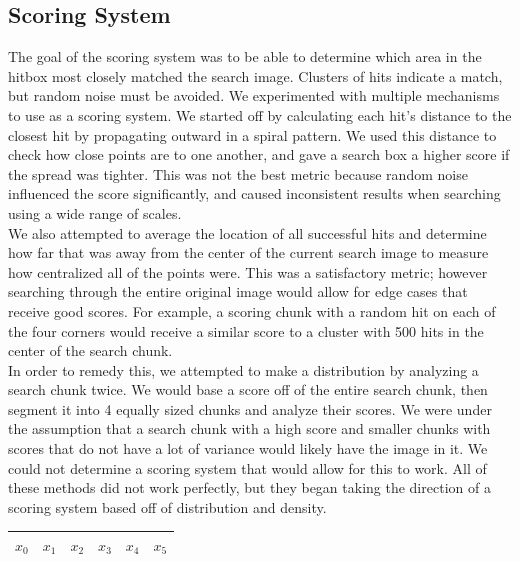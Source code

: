 \documentclass[10pt, journal]{vgtc}                %
\newcommand\tab[1][1cm]{\hspace*{#1}}
\begin{document}
\subsection{Scoring System}
\begin{flushleft}
\tab The goal of the scoring system was to be able to determine which area in the hitbox most closely matched the search image. Clusters of hits indicate a match, but random noise must be avoided. We experimented with multiple mechanisms to use as a scoring system. We started off by calculating each hit’s distance to the closest hit by propagating outward in a spiral pattern. We used this distance to check how close points are to one another, and gave a search box a higher score if the spread was tighter. This was not the best metric because random noise influenced the score significantly, and caused inconsistent results when searching using a wide range of scales.\\\smallskip
\tab We also attempted to average the location of all successful hits and determine how far that was away from the center of the current search image to measure how centralized all of the points were. This was a satisfactory metric; however searching through the entire original image would allow for edge cases that receive good scores. For example, a scoring chunk with a random hit on each of the four corners would receive a similar score to a cluster with 500 hits in the center of the search chunk. \\\smallskip
\tab In order to remedy this, we attempted to make a distribution by analyzing a search chunk twice. We would base a score off of the entire search chunk, then segment it into 4 equally sized chunks and analyze their scores. We were under the assumption that a search chunk with a high score and smaller chunks with scores that do not have a lot of variance would likely have the image in it. We could not determine a scoring system that would allow for this to work. All of these methods did not work perfectly, but they began taking the direction of a scoring system based off of distribution and density. \\\smallskip
\begin{table}[h!]
	\label{vis_accept}
	\scriptsize
	\begin{center}
		\begin{tabular}{cccccc}
			$x_0$ & $x_1$ & $x_2$ & $x_3$ & $x_4$  & $x_5$\\
			\hline

\end{tabular}
\end{center}
\end{table}
\end{flushleft}
\end{document}
